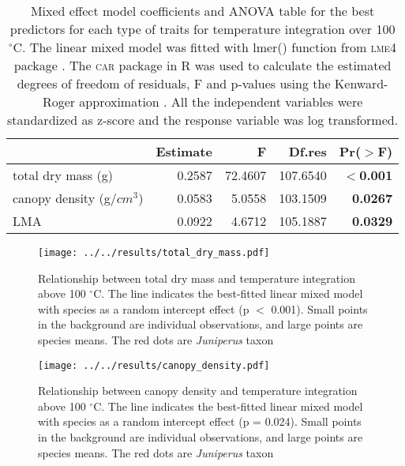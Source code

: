 \documentclass{ttuthes2007}
\newcommand{\pkg}[1]{\textsc{#1}}
\begin{document}


\begin{table}
\centering
\caption{Mixed effect model coefficients and ANOVA table for the best predictors for each type of traits for temperature integration over 100 $^{\circ}$C. The linear mixed model was fitted with lmer() function from \pkg{lme4} package \citep{bates2009package}. The \pkg{car} package in R \citep{fox2013hypothesis} was used to calculate the estimated degrees of freedom of residuals, F and p-values using the Kenward-Roger approximation \citep{kenward1997small}. All the independent variables were standardized  as z-score and the response variable was log transformed.}
\vspace{0.5 cm}
\begin{tabular}{lrrrr}
  \hline
 &  Estimate & F  & Df.res & Pr($>$F) \\ 
  \hline 
  total dry mass (g) & 0.2587 & 72.4607  & 107.6540 & \textbf{$<$0.001} \\ 
  canopy density (g/{$cm^3$}) & 0.0583 & 5.0558  & 103.1509 & \textbf{0.0267} \\ 
  LMA & 0.0922 & 4.6712 &  105.1887 & \textbf{0.0329} \\ 
   \hline
\end{tabular}
\label{tab:fandpstatfortemp}
\end{table}


\begin{figure}
    \centering
    \texttt{[image: ../../results/total\_dry\_mass.pdf]}
    \caption[Dry mass effect on temperature integration]{\label{fig:dm-tempint}Relationship between total dry mass and temperature integration above 100 $^{\circ}$C. The line indicates the best-fitted linear mixed model with species as a random intercept effect (p $<$ 0.001). Small points in the background are individual observations, and large points are species means. The red dots are \emph{Juniperus} taxon}
\end{figure}


\begin{figure}
    \centering
    \texttt{[image: ../../results/canopy\_density.pdf]}
    \caption[short version]{\label{fig:canopyden-tempint} Relationship between canopy density and temperature integration above 100 $^{\circ}$C. The line indicates the best-fitted linear mixed model with species as a random intercept effect (p = 0.024). Small points in the background are individual observations, and large points are species means. The red dots are \emph{Juniperus} taxon}
\end{figure}
\end{document}
